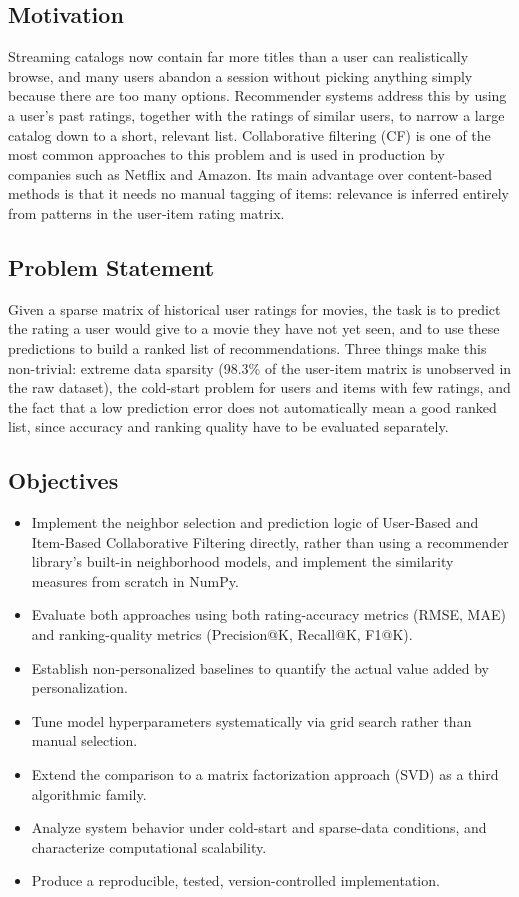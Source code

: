 \documentclass[conference]{IEEEtran}
\begin{document}
\subsection{Motivation}
Streaming catalogs now contain far more titles than a user can realistically browse, and many users abandon a session without picking anything simply because there are too many options. Recommender systems address this by using a user's past ratings, together with the ratings of similar users, to narrow a large catalog down to a short, relevant list. Collaborative filtering (CF) is one of the most common approaches to this problem and is used in production by companies such as Netflix and Amazon. Its main advantage over content-based methods is that it needs no manual tagging of items: relevance is inferred entirely from patterns in the user-item rating matrix.

\subsection{Problem Statement}
Given a sparse matrix of historical user ratings for movies, the task is to predict the rating a user would give to a movie they have not yet seen, and to use these predictions to build a ranked list of recommendations. Three things make this non-trivial: extreme data sparsity (98.3\% of the user-item matrix is unobserved in the raw dataset), the cold-start problem for users and items with few ratings, and the fact that a low prediction error does not automatically mean a good ranked list, since accuracy and ranking quality have to be evaluated separately.

\subsection{Objectives}
\begin{itemize}
\item Implement the neighbor selection and prediction logic of User-Based and Item-Based Collaborative Filtering directly, rather than using a recommender library's built-in neighborhood models, and implement the similarity measures from scratch in NumPy.
\item Evaluate both approaches using both rating-accuracy metrics (RMSE, MAE) and ranking-quality metrics (Precision@K, Recall@K, F1@K).
\item Establish non-personalized baselines to quantify the actual value added by personalization.
\item Tune model hyperparameters systematically via grid search rather than manual selection.
\item Extend the comparison to a matrix factorization approach (SVD) as a third algorithmic family.
\item Analyze system behavior under cold-start and sparse-data conditions, and characterize computational scalability.
\item Produce a reproducible, tested, version-controlled implementation.
\end{itemize}
\end{document}
